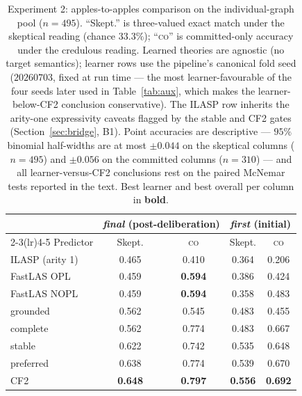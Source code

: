 \documentclass[review,12pt]{elsarticle}
\theoremstyle{definition}
\theoremstyle{remark}
\newcommand{\co}{\textsc{co}}
\newcommand{\best}[1]{\textbf{#1}}
\begin{document}
\begin{table}[t]
\centering
\small
\caption{Experiment 2: apples-to-apples comparison on the individual-graph
pool ($n{=}495$). ``Skept.'' is three-valued exact match under the skeptical
reading (chance $33.3\%$); ``\co{}'' is committed-only accuracy under the
credulous reading. Learned theories are agnostic (no target semantics); learner
rows use the pipeline's canonical fold seed ($20260703$, fixed at run time ---
the most learner-favourable of the four seeds later used in
Table~\ref{tab:aux}, which makes the learner-below-CF2 conclusion
conservative). The ILASP row inherits the arity-one expressivity caveats
flagged by the stable and CF2 gates (Section~\ref{sec:bridge}, B1). Point accuracies are
descriptive --- $95\%$ binomial half-widths are at most $\pm0.044$ on the
skeptical columns ($n{=}495$) and $\pm0.056$ on the committed columns
($n{=}310$) --- and all learner-versus-CF2 conclusions rest on the paired
McNemar tests reported in the text. Best learner and best
overall per column in \best{bold}.}
\label{tab:act1}
\begin{tabular}{lcccc}
\toprule
& \multicolumn{2}{c}{\emph{final} (post-deliberation)} &
\multicolumn{2}{c}{\emph{first} (initial)}\\
\cmidrule(lr){2-3}\cmidrule(lr){4-5}
Predictor & Skept. & \co & Skept. & \co\\
\midrule
ILASP (arity 1)   & 0.465 & 0.410 & 0.364 & 0.206\\
FastLAS OPL       & 0.459 & \best{0.594} & 0.386 & 0.424\\
FastLAS NOPL      & 0.459 & \best{0.594} & 0.358 & 0.483\\
\midrule
grounded          & 0.562 & 0.545 & 0.483 & 0.455\\
complete          & 0.562 & 0.774 & 0.483 & 0.667\\
stable            & 0.622 & 0.742 & 0.535 & 0.648\\
preferred         & 0.638 & 0.774 & 0.539 & 0.670\\
CF2               & \best{0.648} & \best{0.797} & \best{0.556} & \best{0.692}\\
\bottomrule
\end{tabular}
\end{table}
\end{document}
